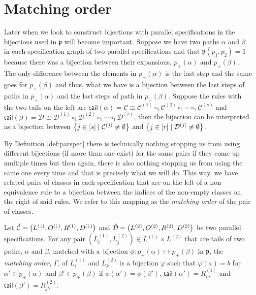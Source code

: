 \section{Matching order}
Later when we look to construct bijections with parallel specifications in  the bijections used in $\mathfrak{p}$ will become important. Suppose we have two paths $\alpha$ and $\beta$ in each specification graph of two parallel specifications and that $\mathfrak{p}(p_1,p_2)=1$ because there was a bijection between their expansions, $p_+(\alpha)$ and $p_+(\beta)$. The only difference between the elements in $p_+(\alpha)$ is the last step and the same goes for $p_+(\beta)$ and thus, what we have is a bijection between the last steps of paths in $p_+(\alpha)$ and the last steps of path in $p_+(\beta)$. Suppose the rules with the two tails on the left are $\textsf{tail}(\alpha) = \mathcal{C} \cong \mathcal{C}^{(1)} \circ_1  \mathcal{C}^{(2)} \circ_1 \dotsm \circ_1 \mathcal{C}^{(s)}$ and $\textsf{tail}(\beta) = \mathcal{D} \cong \mathcal{D}^{(1)} \circ_1  \mathcal{D}^{(2)} \circ_1 \dotsm \circ_1 \mathcal{D}^{(r)}$, then the bijection can be interpreted as a bijection between $\left\{j \in [s] \mid \mathcal{C}^{(j)} \neq \emptyset\right\}$
and $\left\{j \in [r] \mid \mathcal{D}^{(j)} \neq \emptyset\right\}$.

By Definition \ref{def:parspec} there is technically nothing stopping us from using different bijections (if more than one exist) for the same pairs if they come up multiple times but then again, there is also nothing stopping us from using the same one every time and that is precisely what we will do. This way, we have related pairs of classes in each specification that are on the left of a non-equivalence rule to a bijection between the indices of the non-empty classes on the right of said rules. We refer to this mapping as the \emph{matching order} of the pair of classes.

\begin{definition}
Let $\check{\mathcal{C}} = \left(L^{(1)}, O^{(1)}, R^{(1)}, D^{(1)}\right)$ and $\check{\mathcal{D}} = \left(L^{(2)}, O^{(2)}, R^{(2)}, D^{(2)}\right)$ be two parallel specifications. For any pair $\left(L^{(1)}_i,L^{(2)}_j\right) \in L^{(1)}\times L^{(2)}$ that are tails of two paths, $\alpha$ and $\beta$, matched with a bijection $\phi: p_+(\alpha) \mapsto p_+(\beta)$ in $\mathfrak{p}$, the \emph{matching order}, $\Gamma$, of $L^{(1)}_i$ and $L^{(2)}_k$ is a bijection $\varphi$ such that $\varphi(a) = b$ for $\alpha'\in p_+(\alpha)$ and $\beta'\in p_+(\beta)$ if $\phi(\alpha') = \phi(\beta')$, $\textsf{tail}(\alpha') = R^{(1)}_{ia}$ and $\textsf{tail}(\beta')=R^{(2)}_{jb}$.
\end{definition}

